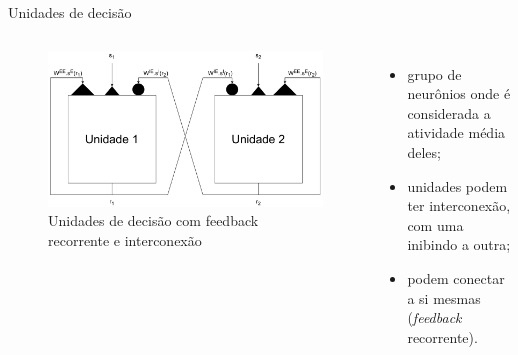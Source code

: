 \begin{frame}{Unidades de decisão}
	\begin{columns}[t]
		\column{5cm}
			\begin{figure}[tb]
				\centering
				\caption{Unidades de decisão com feedback recorrente e interconexão}
				\label{fig:unidadesdecisao}
				\includegraphics[width=\linewidth]{figs/unidades_decisao}
			\end{figure}
		\column{5cm}
			\begin{itemize}
				\item grupo de neurônios onde é considerada a atividade média deles;
				\item unidades podem ter interconexão, com uma inibindo a outra;
				\item podem conectar a si mesmas (\textit{feedback} recorrente).
			\end{itemize}
	\end{columns}
\end{frame}

